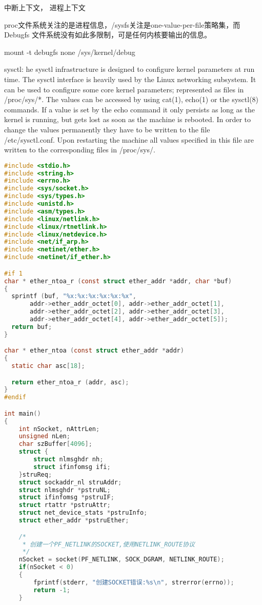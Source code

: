 \documentclass[a4paper,11pt,]{article}%
\begin{document}
\begin{appendices}
中断上下文， 进程上下文

proc文件系统关注的是进程信息，/sysfs关注是one-value-per-file策略集，而Debugfs
文件系统没有如此多限制，可是任何内核要输出的信息。

mount -t debugfs none /sys/kernel/debug


sysctl:
he sysctl infrastructure is designed to configure kernel parameters at run
time. The sysctl interface is heavily used by the Linux networking subsystem.
It can be used to configure some core kernel parameters; represented as files
in /proc/sys/*. The values can be accessed by using cat(1), echo(1) or the
sysctl(8) commands. If a value is set by the echo command it only persists as
long as the kernel is running, but gets lost as soon as the machine is
rebooted. In order to change the values permanently they have to be written to
the file /etc/sysctl.conf. Upon restarting the machine all values specified in
this file are written to the corresponding files in /proc/sys/.

\begin{lstlisting}[language=C, caption= NetLink 获取网卡信息]
#include <stdio.h>
#include <string.h>
#include <errno.h>
#include <sys/socket.h>
#include <sys/types.h>
#include <unistd.h>
#include <asm/types.h>
#include <linux/netlink.h>
#include <linux/rtnetlink.h>
#include <linux/netdevice.h>
#include <net/if_arp.h>
#include <netinet/ether.h>
#include <netinet/if_ether.h>

#if 1
char * ether_ntoa_r (const struct ether_addr *addr, char *buf)
{
  sprintf (buf, "%x:%x:%x:%x:%x:%x",
       addr->ether_addr_octet[0], addr->ether_addr_octet[1],
       addr->ether_addr_octet[2], addr->ether_addr_octet[3],
       addr->ether_addr_octet[4], addr->ether_addr_octet[5]);
  return buf;
}

char * ether_ntoa (const struct ether_addr *addr)
{
  static char asc[18];

  return ether_ntoa_r (addr, asc);
}
#endif

int main()
{
    int nSocket, nAttrLen;
    unsigned nLen;
    char szBuffer[4096];
    struct {
        struct nlmsghdr nh;
        struct ifinfomsg ifi;
    }struReq;
    struct sockaddr_nl struAddr;
    struct nlmsghdr *pstruNL;
    struct ifinfomsg *pstruIF;
    struct rtattr *pstruAttr;
    struct net_device_stats *pstruInfo;
    struct ether_addr *pstruEther;

    /*
     * 创建一个PF_NETLINK的SOCKET,使用NETLINK_ROUTE协议
     */
    nSocket = socket(PF_NETLINK, SOCK_DGRAM, NETLINK_ROUTE);
    if(nSocket < 0)
    {
        fprintf(stderr, "创建SOCKET错误:%s\n", strerror(errno));
        return -1;
    }


\end{lstlisting}
\end{appendices}
\end{document}
